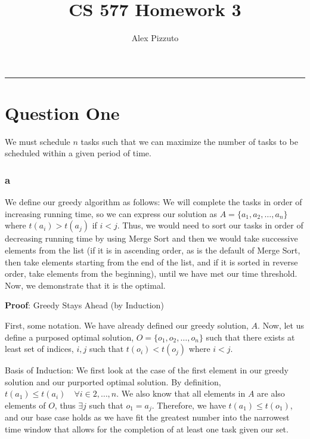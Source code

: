 \documentclass[11pt,letterpaper]{article}
\author{Alex Pizzuto}
\title{CS 577 Homework 3}
\begin{document}
\date{}
\maketitle
\hrule

\section*{Question One}
We must schedule $n$ tasks such that we can maximize the number of tasks to be scheduled within a given period of time.
\subsubsection*{a}
We define our greedy algorithm as follows: We will complete the tasks in order of increasing running time, so we can express our solution as $A = \{ a_1, a_2, \ldots, a_n\}$ where $t(a_i) > t(a_j)$ if $i<j$. Thus, we would need to sort our tasks in order of decreasing running time by using Merge Sort and then we would take successive elements from the list (if it is in ascending order, as is the default of Merge Sort, then take elements starting from the end of the list, and if it is sorted in reverse order, take elements from the beginning), until we have met our time threshold. Now, we demonstrate that it is the optimal. 

\textbf{Proof}: Greedy Stays Ahead (by Induction)

First, some notation. We have already defined our greedy solution, $A$. Now, let us define a purposed optimal solution, $O = \{ o_1, o_2, \ldots, o_n\}$ such that there exists at least set of indices, $i,j$ such that $t(o_i) < t(o_j)$ where $i<j$.

Basis of Induction: We first look at the case of the first element in our greedy solution and our purported optimal solution. By definition, $t(a_1) \leq t(a_i) \quad \forall i \in {2,\ldots ,n}$. We also know that all elements in $A$ are also elements of $O$, thus $\exists j$ such that $o_1 = a_j$. Therefore, we have $t(a_1) \leq t(o_1)$, and our base case holds as we have fit the greatest number into the narrowest time window that allows for the completion of at least one task given our set. 
\end{document}

